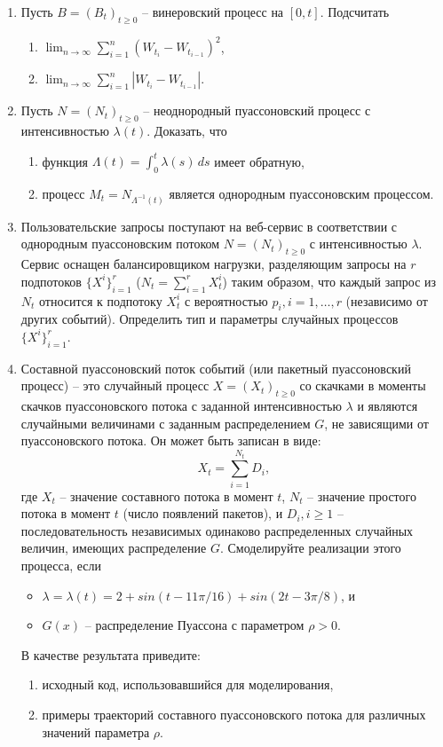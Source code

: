 \documentclass[a4paper,14pt]{extreport}
\renewcommand{\=}[1]{\stackrel{#1}{=}} %
\newcommand{\generaltime}{t \geqslant 0}
\newcommand{\newprocess}[1]{
	\ensuremath{
		#1 = \left(#1 _t\right)_{\generaltime}
	}
}
\begin{document}
\begin{enumerate}
\item Пусть $\newprocess{B}$ -- винеровский процесс на $[0, t]$. Подсчитать 
	\begin{enumerate}
	    \item $\lim_{n \to \infty} \sum_{i=1}^n \left(W_{t_i} - W_{t_{i-1}}\right)^2$,
	    \item $\lim_{n \to \infty} \sum_{i=1}^n \left|W_{t_i} - W_{t_{i-1}}\right|$.
	\end{enumerate}

\item Пусть $\newprocess{N}$ -- неоднородный пуассоновский
процесс с интенсивностью $\lambda(t)$. Доказать, что 
	\begin{enumerate}
	    \item функция $\Lambda(t) = \int_{0}^t \lambda(s) \, ds$ имеет обратную,
	    \item процесс $M_t = N_{\Lambda^{-1}(t)}$ является однородным пуассоновским процессом. 
	\end{enumerate}

\item Пользовательские запросы поступают на веб-сервис
в соответствии с однородным пуассоновским потоком $\newprocess{N}$
с интенсивностью $\lambda$. Сервис оснащен балансировщиком
нагрузки, разделяющим запросы на $r$ подпотоков
$\{X^i\}_{i = 1}^r$ ($N_t = \sum_{i=1}^r X^i_t$)
таким образом, что каждый запрос из $N_t$ 
относится к подпотоку $X^i_t$ с вероятностью
$p_i, i=1, \ldots, r$ (независимо от других событий).
Определить тип и параметры случайных процессов
$\{X^i\}_{i = 1}^r$.

\item Составной пуассоновский поток событий (или пакетный пуассоновский процесс)
-- это случайный процесс $\newprocess{X}$ со скачками в моменты
скачков пуассоновского потока с заданной интенсивностью $\lambda$
и являются случайными величинами с заданным распределением $G$,
не зависящими от пуассоновского потока. Он может быть записан в виде:
\[
X_t = \sum\limits_{i = 1}^{N_t} D_i,
\]
где $X_t$ -- значение составного потока в момент $t$, $N_t$ -- 
значение простого потока в момент $t$ (число появлений пакетов),
и $D_i, i \geqslant 1$ -- последовательность независимых
одинаково распределенных случайных величин, имеющих распределение $G$.
Смоделируйте реализации этого процесса, если
	\begin{itemize}
		\item $\lambda = \lambda(t) = 
		2 + sin (t - 11\pi/16) + sin (2t - 3\pi/8)$, и
		\item $G(x)$ -- распределение Пуассона с параметром $\rho > 0$.
	\end{itemize}
В качестве результата приведите:
\begin{enumerate}
	\item исходный код, использовавшийся для моделирования,
	\item примеры траекторий составного пуассоновского потока
	для различных значений параметра $\rho$.
\end{enumerate}


\end{enumerate}
\end{document}
